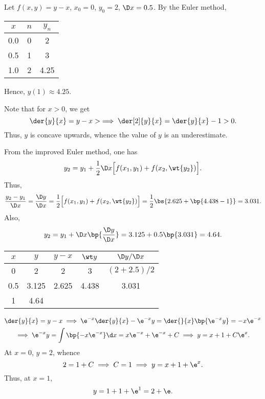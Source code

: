 \begin{solution}
    \begin{ppart}
        Let $f(x, y) = y - x$, $x_0 = 0$, $y_0 = 2$, $\D x = 0.5$. By the Euler method,

        \begin{center}
            \begin{tabular}{|c|c|c|}
                \hline
                $x$ & $n$ & $y_n$ \\ \hline\hline
                0.0 & 0 & 2 \\ \hline
                0.5 & 1 & 3 \\ \hline
                1.0 & 2 & 4.25 \\ \hline
            \end{tabular}
        \end{center}

        Hence, $y(1) \approx 4.25$.

        Note that for $x > 0$, we get \[\der{y}{x} = y - x >  \implies \der[2]{y}{x} = \der{y}{x} - 1 > 0.\] Thus, $y$ is concave upwards, whence the value of $y$ is an underestimate.
    \end{ppart}
    \begin{ppart}
        From the improved Euler method, one has \[y_2 = y_1 + \frac12 \D x \Big[f(x_1, y_1) + f(x_2, \wt{y_2})\Big].\] Thus, \[\frac{y_2 - y_1}{\D x} = \frac{\D y}{\D x} = \frac12 \Big[f(x_1, y_1) + f(x_2, \wt{y_2})\Big] = \frac12\bs{2.625 + \bp{4.438 - 1}} = 3.031.\]
        Also, \[y_2 = y_1 + \D x \bp{\frac{\D y}{\D x}} = 3.125 + 0.5 \bp{3.031} = 4.64.\]

        \begin{table}[H]
            \centering
            \begin{tabular}{|c|c|c|c|c|}
            \hline
            $x$ & $y$ & $y-x$ & $\wt y$ & $\D y / \D x$ \\ \hline\hline
            0 & 2 & 2 & 3 & $(2 + 2.5)/2$\\ \hline
            0.5 & 3.125 & 2.625 & 4.438 & 3.031 \\ \hline
            1 & 4.64 & \cellcolor{black!10} & \cellcolor{black!10} & \cellcolor{black!10}\\\hline
            \end{tabular}
        \end{table}
    \end{ppart}
    \begin{ppart}
        \begin{gather*}
            \der{y}{x} = y - x \implies \e^{-x}\der{y}{x} - \e^{-x} y = \der{}{x} \bp{\e^{-x}y} = -x\e^{-x}\\
            \implies \e^{-x} y = \int \bp{-x\e^{-x}} \d x = x\e^{-x} + \e^{-x} + C \implies y = x + 1 + C\e^x.
        \end{gather*}
        At $x = 0$, $y = 2$, whence \[2 = 1 + C \implies C = 1 \implies y = x + 1 + \e^x.\] Thus, at $x = 1$, \[y = 1 + 1 + \e^1 = 2 + \e.\]
    \end{ppart}
\end{solution}

